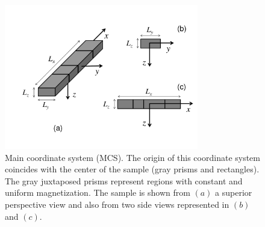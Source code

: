 \documentclass[draft,gc]{agutex}
\begin{document}
%
%
%
%

 \clearpage
 
 \begin{figure}
 \noindent \includegraphics[width=20pc]{Figs/Fig1_HQ.pdf}
 \caption{Main coordinate system (MCS). The origin of this coordinate system 
 coincides with the center of the sample (gray prisms and rectangles).
 The gray juxtaposed prisms represent 
 regions with constant and uniform magnetization. 
 The sample is shown from 
 $\left(a\right)$ a superior perspective view and also from two side 
 views represented in $\left(b\right)$ and $\left(c\right)$.}
 \label{fig:sample}
 \end{figure} 
 
\end{document}

